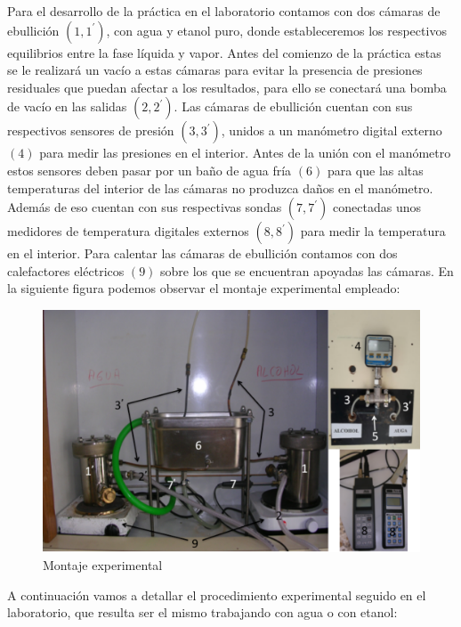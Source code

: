\documentclass[a4paper,12pt,titlepage]{article}
\begin{document}
Para el desarrollo de la práctica en el laboratorio contamos con dos cámaras de ebullición $(1,1^{\prime})$, con agua y etanol puro, donde estableceremos los respectivos equilibrios entre la fase líquida y vapor. Antes del comienzo de la práctica estas se le realizará un vacío a estas cámaras para evitar la presencia de presiones residuales que puedan afectar a los resultados, para ello se conectará una bomba de vacío en las salidas $(2,2^{\prime})$. Las cámaras de ebullición cuentan con sus respectivos sensores de presión $(3,3^{\prime})$, unidos a un manómetro digital externo $(4)$ para medir las presiones en el interior. Antes de la unión con el manómetro estos sensores deben pasar por un baño de agua fría $(6)$ para que las altas temperaturas del interior de las cámaras no produzca daños en el manómetro. Además de eso cuentan con sus respectivas sondas $(7,7^{\prime})$ conectadas unos medidores de temperatura digitales externos $(8,8^{\prime})$ para medir la temperatura en el interior. Para calentar las cámaras de ebullición contamos con dos calefactores eléctricos $(9)$ sobre los que se encuentran apoyadas las cámaras. En la siguiente figura podemos observar el montaje experimental empleado:

\begin{figure}[h!]
    \centering
    \includegraphics[width=0.65\linewidth]{ELV simple/material.png}
    \caption{Montaje experimental}
    \label{fig:enter-label}
\end{figure}

A continuación vamos a detallar el procedimiento experimental seguido en el laboratorio, que resulta ser el mismo trabajando con agua o con etanol:
\end{document}
